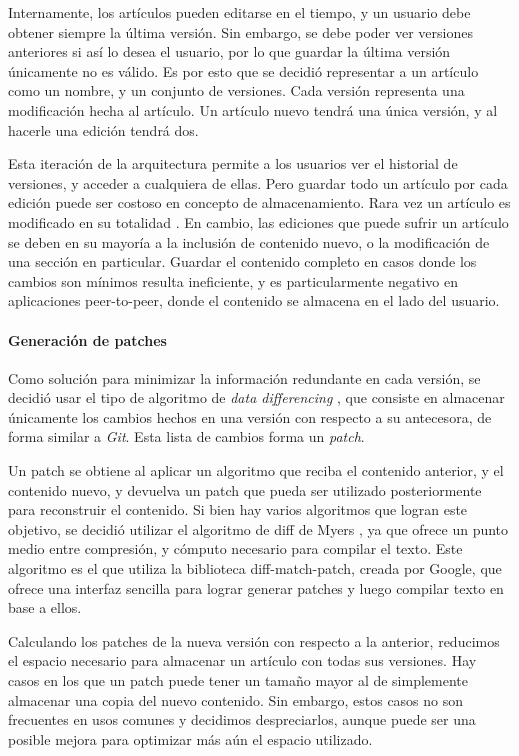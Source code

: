 Internamente, los artículos pueden editarse en el tiempo, y un usuario debe obtener siempre la última versión. Sin embargo, se debe poder ver versiones anteriores si así lo desea el usuario, por lo que guardar la última versión únicamente no es válido. Es por esto que se decidió representar a un artículo como un nombre, y un conjunto de versiones. Cada versión representa una modificación hecha al artículo. Un artículo nuevo tendrá una única versión, y al hacerle una edición tendrá dos.

Esta iteración de la arquitectura permite a los usuarios ver el historial de versiones, y acceder a cualquiera de ellas. Pero guardar todo un artículo por cada edición puede ser costoso en concepto de almacenamiento. Rara vez un artículo es modificado en su totalidad \cite{wiki-edits-stats}. En cambio, las ediciones que puede sufrir un artículo se deben en su mayoría a la inclusión de contenido nuevo, o la modificación de una sección en particular. Guardar el contenido completo en casos donde los cambios son mínimos resulta ineficiente, y es particularmente negativo en aplicaciones peer-to-peer, donde el contenido se almacena en el lado del usuario.

\paragraph{Generación de patches}

Como solución para minimizar la información redundante en cada versión, se decidió usar el tipo de algoritmo de \textit{data differencing} \cite{data-differencing}, que consiste en almacenar únicamente los cambios hechos en una versión con respecto a su antecesora, de forma similar a \textit{Git}. Esta lista de cambios forma un \textit{patch}.

Un patch se obtiene al aplicar un algoritmo que reciba el contenido anterior, y el contenido nuevo, y devuelva un patch que pueda ser utilizado posteriormente para reconstruir el contenido. Si bien hay varios algoritmos que logran este objetivo, se decidió utilizar el algoritmo de diff de Myers \cite{myers-diff}, ya que ofrece un punto medio entre compresión, y cómputo necesario para compilar el texto. Este algoritmo es el que utiliza la biblioteca diff-match-patch, creada por Google, que ofrece una interfaz sencilla para lograr generar patches y luego compilar texto en base a ellos.

Calculando los patches de la nueva versión con respecto a la anterior, reducimos el espacio necesario para almacenar un artículo con todas sus versiones.  Hay casos en los que un patch puede tener un tamaño mayor al de simplemente almacenar una copia del nuevo contenido. Sin embargo, estos casos no son frecuentes en usos comunes y decidimos despreciarlos, aunque puede ser una posible mejora para optimizar más aún el espacio utilizado.

